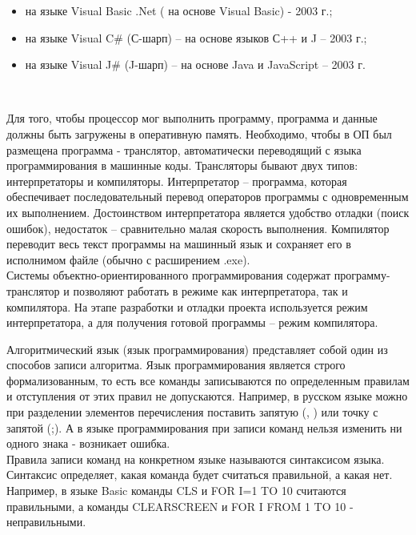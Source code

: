 \begin{itemize}
  \item на языке Visual Basic .Net ( на основе Visual Basic) - 2003 г.;
  \item на языке Visual C\# (С-шарп) – на основе языков С++ и J – 2003 г.;
  \item на языке Visual J\# (J-шарп) – на основе Java и JavaScript – 2003 г.
\end{itemize}
\


Для того, чтобы процессор мог выполнить программу, программа и данные должны быть загружены в оперативную память. Необходимо, чтобы в ОП был размещена программа - транслятор, автоматически переводящий с языка программирования в машинные коды. Трансляторы бывают двух типов: интерпретаторы и компиляторы. Интерпретатор – программа, которая обеспечивает последовательный перевод операторов программы с одновременным их выполнением. Достоинством интерпретатора является удобство отладки (поиск ошибок), недостаток – сравнительно малая скорость выполнения. Компилятор переводит весь текст программы на машинный язык и сохраняет его в исполнимом файле (обычно с расширением .exe). \\

Системы объектно-ориентированного программирования содержат программу-транслятор и позволяют работать в режиме как интерпретатора, так и компилятора. На этапе разработки и отладки проекта используется режим интерпретатора, а для получения готовой программы – режим компилятора. \\



Алгоритмический язык (язык программирования) представляет собой один из способов записи алгоритма. Язык программирования является строго формализованным, то есть все команды записываются по определенным правилам и отступления от этих правил не допускаются. Например, в русском языке можно при разделении элементов перечисления поставить запятую (, ) или точку с запятой (;). А в языке программирования при записи команд нельзя изменить ни одного знака - возникает ошибка. \\

Правила записи команд на конкретном языке называются синтаксисом языка. Синтаксис определяет, какая команда будет считаться правильной, а какая нет. Например, в языке Basic команды CLS и FOR I=1 TO 10 считаются правильными, а команды CLEARSCREEN и FOR I FROM 1 TO 10 - неправильными. \\

